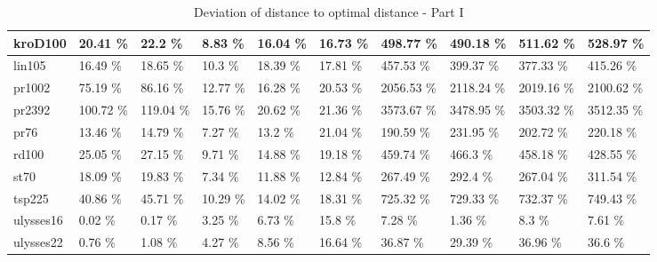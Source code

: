 \documentclass[conference]{IEEEtran}
\begin{document}
\begin{table}[h]
\begin{adjustbox}{width=\columnwidth}
\begin{tabular}{ | l | l | l | l | l | l | l | l | l | l | }
kroD100 & 20.41 \% & 22.2 \% & 8.83 \% & 16.04 \% & 16.73 \% & 498.77 \% & 490.18 \% & 511.62 \% & 528.97 \%   \\ \hline
lin105 & 16.49 \% & 18.65 \% & 10.3 \% & 18.39 \% & 17.81 \% & 457.53 \% & 399.37 \% & 377.33 \% & 415.26 \%   \\ \hline
pr1002 & 75.19 \% & 86.16 \% & 12.77 \% & 16.28 \% & 20.53 \% & 2056.53 \% & 2118.24 \% & 2019.16 \% & 2100.62 \%   \\ \hline
pr2392 & 100.72 \% & 119.04 \% & 15.76 \% & 20.62 \% & 21.36 \% & 3573.67 \% & 3478.95 \% & 3503.32 \% & 3512.35 \%   \\ \hline
pr76 & 13.46 \% & 14.79 \% & 7.27 \% & 13.2 \% & 21.04 \% & 190.59 \% & 231.95 \% & 202.72 \% & 220.18 \%   \\ \hline
rd100 & 25.05 \% & 27.15 \% & 9.71 \% & 14.88 \% & 19.18 \% & 459.74 \% & 466.3 \% & 458.18 \% & 428.55 \%   \\ \hline
st70 & 18.09 \% & 19.83 \% & 7.34 \% & 11.88 \% & 12.84 \% & 267.49 \% & 292.4 \% & 267.04 \% & 311.54 \%   \\ \hline
tsp225 & 40.86 \% & 45.71 \% & 10.29 \% & 14.02 \% & 18.31 \% & 725.32 \% & 729.33 \% & 732.37 \% & 749.43 \%   \\ \hline
ulysses16 & 0.02 \% & 0.17 \% & 3.25 \% & 6.73 \% & 15.8 \% & 7.28 \% & 1.36 \% & 8.3 \% & 7.61 \%   \\ \hline
ulysses22 & 0.76 \% & 1.08 \% & 4.27 \% & 8.56 \% & 16.64 \% & 36.87 \% & 29.39 \% & 36.96 \% & 36.6 \%   \\ \hline
	    \end{tabular}
	    \end{adjustbox}
	    \caption{Deviation of distance to optimal distance - Part I}
	    \label{tab:deviationp1}
	\end{table}
	
\end{document}
